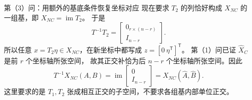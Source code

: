 \documentclass[11pt]{article}
\begin{document}
\begin{solution}
\begin{proofstep}{第（3）问：用额外的基底条件恢复坐标对应}
现在要求 $T_2$ 的列恰好构成 $X_{NC}$ 的一组基，即 $X_{NC}=\operatorname{im}T_2$。
于是
\[
T^{-1}T_2=\begin{bmatrix}0_{r\times(n-r)}\\I_{n-r}\end{bmatrix}.
\]
所以任意 $x=T_2\eta\in X_{NC}$，在新坐标中都写成 $z=[0\ \eta^{\mathsf T}]^{\mathsf T}$。
第（1）问已证 $\widehat X_C$ 是前 $r$ 个坐标轴所张空间，
故其正交补恰为后 $n-r$ 个坐标轴所张空间。因此
\[
\boxed{T^{-1}X_{NC}(A,B)
=\operatorname{im}\begin{bmatrix}0\\I_{n-r}\end{bmatrix}
=X_{NC}(\widehat A,\widehat B).}
\]
这里要求的是 $T_1,T_2$ 张成相互正交的子空间，不要求各组基内部单位正交。
\end{proofstep}
\end{solution}
\end{document}
